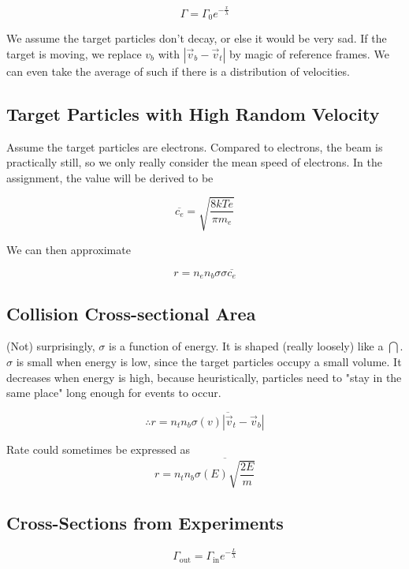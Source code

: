 \documentclass[12pt]{article}
\begin{document}
\begin{equation}
    \Gamma = \Gamma_0e^{-\frac{x}{\lambda}}
\end{equation}

We assume the target particles don't decay, or else it would be very sad. If the target is moving, we replace $v_b$ with $|\vec v_b - \vec v_t|$ by magic of reference frames. We can even take the average of such if there is a distribution of velocities.

\subsection{Target Particles with High Random Velocity}

Assume the target particles are electrons. Compared to electrons, the beam is practically still, so we only really consider the mean speed of electrons. In the assignment, the value will be derived to be

$$\overline{c_e} = \sqrt{\frac{8kTe}{\pi m_e}}$$

We can then approximate

\begin{equation}
    r = n_en_b\sigma\sigma\overline{c_e}
\end{equation}

\subsection{Collision Cross-sectional Area}

(Not) surprisingly, $\sigma$ is a function of energy. It is shaped (really loosely) like a $\bigcap$. $\sigma$ is small when energy is low, since the target particles occupy a small volume. It decreases when energy is high, because heuristically, particles need to "stay in the same place" long enough for events to occur.

$$\therefore r = n_tn_b \overline{\sigma(v)|\vec v_t - \vec v_b|}$$

\begin{ex}
    Rate could sometimes be expressed as
    $$r = n_tn_b \overline{\sigma(E)\sqrt{\frac{2E}{m}}}$$
\end{ex}

\subsection{Cross-Sections from Experiments}

\begin{equation}
    \Gamma_{\text{out}} = \Gamma_{\text{in}} e^{-\frac{L}{\lambda}}
\end{equation}
\end{document}
